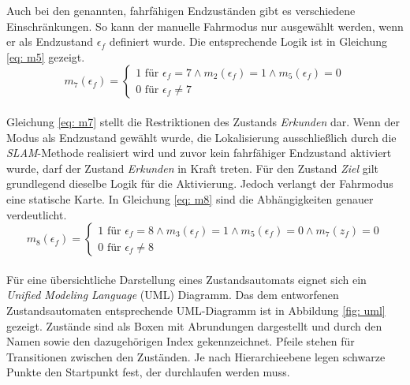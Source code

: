 		Auch bei den genannten, fahrfähigen Endzuständen gibt es verschiedene Einschränkungen. So kann der manuelle Fahrmodus nur ausgewählt werden, wenn er als Endzustand $\epsilon_f$ definiert wurde. Die entsprechende Logik ist in Gleichung \ref{eq: m5} gezeigt.\\
		
				\begin{equation}
					m_7(\epsilon_f)=\left\{\begin{array}{ll} 1 \text{ für } \epsilon_f=7 \wedge m_2(\epsilon_f)=1 \wedge m_5(\epsilon_f)=0 \\
						0 \text{ für }\epsilon_f\neq 7\end{array}\right.
					\label{eq: m7}
				\end{equation}\\
				
		Gleichung \ref{eq: m7} stellt die Restriktionen des Zustands \textit{Erkunden} dar. Wenn der Modus als Endzustand gewählt wurde, die Lokalisierung ausschließlich durch die \textit{SLAM}-Methode realisiert wird und zuvor kein fahrfähiger Endzustand aktiviert wurde, darf der Zustand \textit{Erkunden} in Kraft treten. Für den Zustand \textit{Ziel} gilt grundlegend dieselbe Logik für die Aktivierung. Jedoch verlangt der Fahrmodus eine statische Karte. In Gleichung \ref{eq: m8} sind die Abhängigkeiten genauer verdeutlicht.\\
		
		
				\begin{equation}
					m_8(\epsilon_f)=\left\{\begin{array}{ll} 1 \text{ für } \epsilon_f=8 \wedge m_3(\epsilon_f)=1 \wedge m_5(\epsilon_f)=0 \wedge m_7(z_f)=0 \\
						0 \text{ für }\epsilon_f\neq 8\end{array}\right.
					\label{eq: m8}
				\end{equation}\\
		
		Für eine übersichtliche Darstellung eines Zustandsautomats eignet sich ein \textit{Unified Modeling Language} (UML) Diagramm. Das dem entworfenen Zustandsautomaten entsprechende UML-Diagramm ist in Abbildung \ref{fig: uml} gezeigt. Zustände sind als Boxen mit Abrundungen dargestellt und durch den Namen sowie den dazugehörigen Index gekennzeichnet. Pfeile stehen für Transitionen zwischen den Zuständen. Je nach Hierarchieebene legen schwarze Punkte den Startpunkt fest, der durchlaufen werden muss. 
		
	
	
